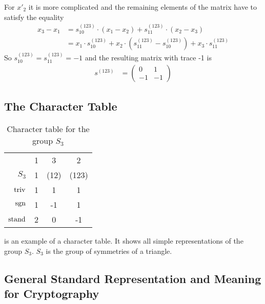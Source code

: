 For $x'_2$ it is more complicated and the remaining elements of the matrix have to satisfy the equality
\begin{align*}
    x_3 - x_1 & = s^{(123)}_{10} \cdot (x_1 - x_2) + s^{(123)}_{11} \cdot (x_2 - x_3) \\
    & = x_1 \cdot s^{(123)}_{10} + x_2 \cdot (s^{(123)}_{11} - s^{(123)}_{10}) + x_3 \cdot s^{(123)}_{11}
\end{align*}
So $s^{(123)}_{10} = s^{(123)}_{11} = -1$ and  the resulting matrix with trace -1 is
\begin{align*}
    s^{(123)} & = \begin{pmatrix}
        0 & 1 \\
        -1 & -1
    \end{pmatrix}
\end{align*}


\subsection{The Character Table}


\begin{table}
    \centering

    \begin{tabular}{r | c  c  c}
                    & 1 & 3     & 2     \\
        $S_3$       & 1 & (12)  & (123) \\ \hline
        $\operatorname{triv}$     & 1 & 1     & 1     \\
        $\operatorname{sgn}$      & 1 & -1    & 1     \\
        $\operatorname{stand}$    & 2 & 0     & -1
    \end{tabular}

    \caption{Character table for the group $S_3$}
    \label{tab:reprep.char.table}
\end{table}

 is an example of a character table.
It shows all simple representations of the group $S_3$.
$S_3$ is the group of symmetries of a triangle.

\subsection{General Standard Representation and Meaning for Cryptography}

